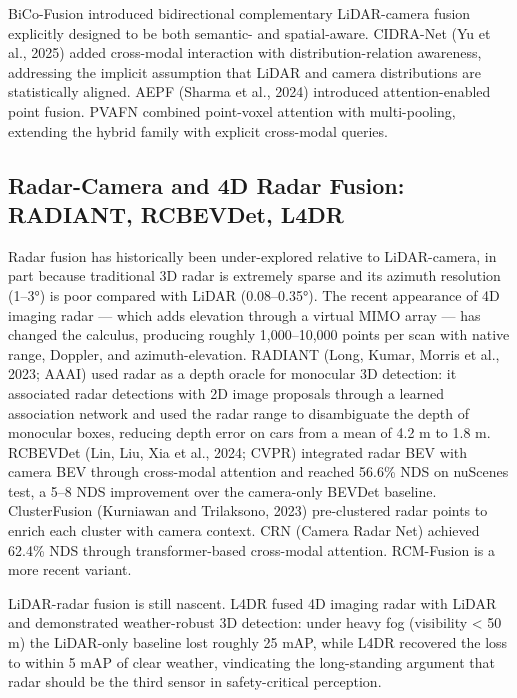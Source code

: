 \documentclass{article}
\begin{document}
BiCo-Fusion \citep{song2024robustnessaware3do} introduced bidirectional complementary LiDAR-camera fusion explicitly designed to be both semantic- and spatial-aware. CIDRA-Net (Yu et al., 2025) added cross-modal interaction with distribution-relation awareness, addressing the implicit assumption that LiDAR and camera distributions are statistically aligned. AEPF (Sharma et al., 2024) introduced attention-enabled point fusion. PVAFN \citep{li2024bevformerlearningb} combined point-voxel attention with multi-pooling, extending the hybrid family with explicit cross-modal queries.

\subsection{Radar-Camera and 4D Radar Fusion: RADIANT, RCBEVDet, L4DR}\label{radar-camera-and-4d-radar-fusion-radiant-rcbevdet-l4dr}

Radar fusion has historically been under-explored relative to LiDAR-camera, in part because traditional 3D radar is extremely sparse and its azimuth resolution (1--3°) is poor compared with LiDAR (0.08--0.35°). The recent appearance of 4D imaging radar --- which adds elevation through a virtual MIMO array --- has changed the calculus, producing roughly 1,000--10,000 points per scan with native range, Doppler, and azimuth-elevation. RADIANT (Long, Kumar, Morris et al., 2023; AAAI) used radar as a depth oracle for monocular 3D detection: it associated radar detections with 2D image proposals through a learned association network and used the radar range to disambiguate the depth of monocular boxes, reducing depth error on cars from a mean of 4.2 m to 1.8 m. RCBEVDet (Lin, Liu, Xia et al., 2024; CVPR) integrated radar BEV with camera BEV through cross-modal attention and reached 56.6\% NDS on nuScenes test, a 5--8 NDS improvement over the camera-only BEVDet baseline. ClusterFusion (Kurniawan and Trilaksono, 2023) pre-clustered radar points to enrich each cluster with camera context. CRN (Camera Radar Net) achieved 62.4\% NDS through transformer-based cross-modal attention. RCM-Fusion is a more recent variant.

LiDAR-radar fusion is still nascent. L4DR \citep{huang2024l4drlidar4dradarfu} fused 4D imaging radar with LiDAR and demonstrated weather-robust 3D detection: under heavy fog (visibility \textless{} 50 m) the LiDAR-only baseline lost roughly 25 mAP, while L4DR recovered the loss to within 5 mAP of clear weather, vindicating the long-standing argument that radar should be the third sensor in safety-critical perception.
\end{document}
